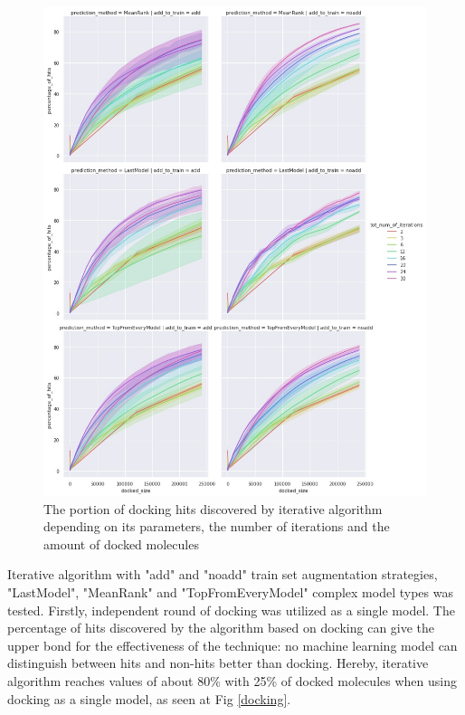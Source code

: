 \begin{figure} %
    \centering
    \includegraphics[width = \linewidth]{Images/LinregIterations.jpg}
    \caption{The portion of docking hits discovered by iterative algorithm depending on its parameters, the number of iterations and the amount of docked molecules}
\end{figure}

Iterative algorithm with "add" and "noadd" train set augmentation strategies, "LastModel", 
"MeanRank" and "TopFromEveryModel" complex model types was tested. 
Firstly, independent round of docking was utilized as a single model.
The percentage of hits discovered by the algorithm based on docking can give the 
upper bond for the effectiveness of the technique: no machine learning model 
can distinguish between hits and non-hits better than docking. 
Hereby, iterative algorithm reaches values of about 80\% with 25\% of docked molecules 
when using docking as a single model, as seen at Fig \ref{docking}.\\

